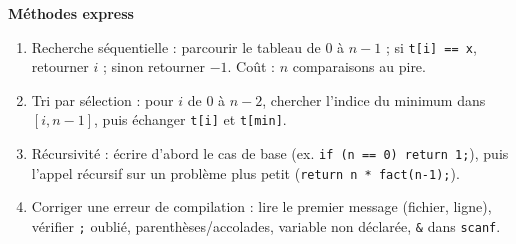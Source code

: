 \documentclass[11pt]{article}
\newcommand{\cle}[1]{{\popxbold\color{popdark}#1}}
\begin{document}
\begin{bilan}
\textbf{Méthodes express}
\begin{enumerate}
  \item \cle{Recherche séquentielle} : parcourir le tableau de $0$ à $n-1$ ; si \texttt{t[i] == x}, retourner $i$ ; sinon retourner $-1$. Coût : $n$ comparaisons au pire.
  \item \cle{Tri par sélection} : pour $i$ de $0$ à $n-2$, chercher l'indice du minimum dans $[i, n-1]$, puis échanger \texttt{t[i]} et \texttt{t[min]}.
  \item \cle{Récursivité} : écrire d'abord le cas de base (ex. \texttt{if (n == 0) return 1;}), puis l'appel récursif sur un problème plus petit (\texttt{return n * fact(n-1);}).
  \item \cle{Corriger une erreur de compilation} : lire le premier message (fichier, ligne), vérifier \texttt{;} oublié, parenthèses/accolades, variable non déclarée, \texttt{\&} dans \texttt{scanf}.
\end{enumerate}
\end{bilan}
\end{document}
